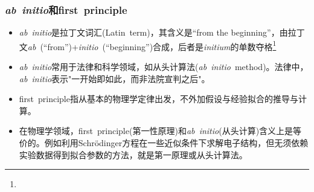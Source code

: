 %
\frame
{
	\frametitle{\textit{ab~initio}和\textrm{first~principle}}
	\begin{itemize}
		\item \textit{ab~initio}是拉丁文词汇\textrm{(Latin~term)}，其含义是\textrm{``from the beginning''}，由拉丁文\textit{ab}~\textrm{(``from'')}+\textit{initio}~\textrm{(``beginning'')}合成，后者是\textit{initium}的单数夺格\footnote{\fontsize{5.5pt}{4.2pt}}
		\item \textit{ab~initio}常用于法律和科学领域，如从头计算法(\textit{ab~initio}~\textrm{method})。法律中，\textit{ab~initio}表示"一开始即如此，而非法院宣判之后"。
		\item \textrm{first~principle}指从基本的物理学定律出发，不外加假设与经验拟合的推导与计算。
		\item 在物理学领域，\textrm{first~principle}(第一性原理)和\textit{ab~initio}(从头计算)含义上是等价的。例如利用\textrm{Schr\"odinger}方程在一些近似条件下求解电子结构，但无须依赖实验数据得到拟合参数的方法，就是第一原理或从头计算法。
	\end{itemize}
}

